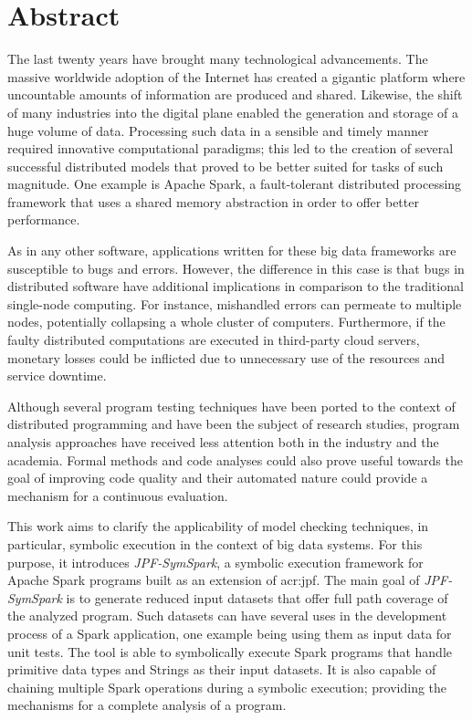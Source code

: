 \section*{Abstract}

The last twenty years have brought many technological advancements. The massive worldwide adoption of the Internet has created a gigantic platform where uncountable amounts of information are produced and shared. Likewise, the shift of many industries into the digital plane enabled the generation and storage of a huge volume of data. Processing such data in a sensible and timely manner required innovative computational paradigms; this led to the creation of several successful distributed models that proved to be better suited for tasks of such magnitude. One example is Apache Spark, a fault-tolerant distributed processing framework that uses a shared memory abstraction in order to offer better performance.

As in any other software, applications written for these big data frameworks are susceptible to bugs and errors. However, the difference in this case is that bugs in distributed software have additional implications in comparison to the traditional single-node computing. For instance, mishandled errors can permeate to multiple nodes, potentially collapsing a whole cluster of computers. Furthermore, if the faulty distributed computations are executed in third-party cloud servers, monetary losses could be inflicted due to unnecessary use of the resources and service downtime.

Although several program testing techniques have been ported to the context of distributed programming and have been the subject of research studies, program analysis approaches have received less attention both in the industry and the academia. Formal methods and code analyses could also prove useful towards the goal of improving code quality and their automated nature could provide a mechanism for a continuous evaluation.

This work aims to clarify the applicability of model checking techniques, in particular, symbolic execution in the context of big data systems. For this purpose, it introduces \textit{JPF-SymSpark}, a symbolic execution framework for Apache Spark programs built as an extension of \acrlong{acr:jpf}. The main goal of \textit{JPF-SymSpark} is to generate reduced input datasets that offer full path coverage of the analyzed program. Such datasets can have several uses in the development process of a Spark application, one example being using them as input data for unit tests. The tool is able to symbolically execute Spark programs that handle primitive data types and Strings as their input datasets. It is also capable of chaining multiple Spark operations during a symbolic execution; providing the mechanisms for a complete analysis of a program.

